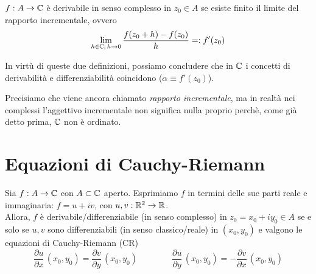 \begin{defn}
$f:A\to\mathbb{C}$ è derivabile in senso complesso in $z_0\in A$ se esiste finito il limite del rapporto incrementale, ovvero
\begin{equation*}
\lim_{h\in\mathbb{C},\,h\rightarrow 0}\frac{f(z_0 + h) - f(z_0)}{h}=:f'(z_0)
\end{equation*}
\end{defn}

\begin{rem}
In virtù di queste due definizioni, possiamo concludere che in $\mathbb{C}$ i concetti di derivabilità e differenziabilità coincidono ($\alpha\equiv f'(z_0)$).
\end{rem}

Precisiamo che viene ancora chiamato \textit{rapporto incrementale}, ma in realtà nei complessi l'aggettivo incrementale non significa nulla proprio perchè, come già detto prima, $\mathbb{C}$ non è ordinato.

\section{Equazioni di Cauchy-Riemann}

\begin{thm}
Sia $f:A\to\mathbb{C}$ con $A\subset\mathbb{C}$ aperto. Esprimiamo $f$ in termini delle sue parti reale e immaginaria: $f=u+iv$, con $u,v:\mathbb{R}^2\to\mathbb{R}$. \\
Allora, $f$ è derivabile/differenziabile (in senso complesso) in $z_0=x_0+iy_0\in A$ se e solo se $u,v$ sono differenziabili (in senso classico/reale) in $(x_0,y_0)$ e valgono le equazioni di Cauchy-Riemann (CR)
\begin{equation*}
\boxed{\frac{\partial u}{\partial x}\,(x_0,y_0)=\frac{\partial v}{\partial y}\,(x_0,y_0)} \qquad\qquad \boxed{\frac{\partial u}{\partial y}\,(x_0,y_0)=-\frac{\partial v}{\partial x}\,(x_0,y_0)}
\end{equation*}
\end{thm}

